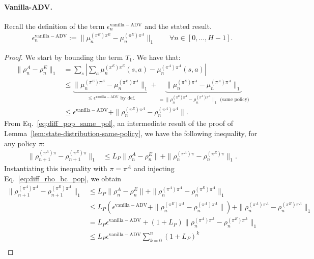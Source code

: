 \documentclass{article}
\begin{document}
\paragraph{Vanilla-ADV. } Recall the definition of the term $\epsilon_n^\mathrm{vanilla-ADV}$ and the stated result.
\begin{align}
    \epsilon^{\mathrm{vanilla-ADV}}_n := \|\mu^{(\pi^E)\pi^E}_n - \mu^{(\pi^E)\pi^A}_n \|_1 \qquad \forall n \in [0, \dots, H-1].
\end{align}

\boundvanillagail*
\begin{proof}
We start by bounding the term $T_1$. We have that:
\begin{align}
    \|\rho_n^A - \rho_n^E\|_1 &= \sum_s |\sum_a \mu_n^{(\pi^E)\pi^E}(s,a) - \mu_n^{(\pi^A)\pi^A}(s,a)|
    \\
    &\leq \underbrace{\|\mu_n^{(\pi^E)\pi^E} - \mu_n^{(\pi^E)\pi^A}\|_1}_{\leq \epsilon^{\mathrm{vanilla-ADV}} \text{ by def.}}
    + \underbrace{\|\mu_n^{(\pi^E)\pi^A} - \mu_n^{(\pi^A)\pi^A}\|_1}_{ = \|\rho_n^{(\pi^E)\pi^A} - \rho_n^{(\pi^A)\pi^A}\|_1 \text{ (same policy)}}
    \\
    &\leq \epsilon^{\mathrm{vanilla-ADV}} + \|\rho_n^{(\pi^E)\pi^A} - \rho_n^{(\pi^A)\pi^A}\|.
    \label{eq:diff_rho_bc_pop}
\end{align}
From Eq.~\eqref{eq:diff_pop_same_pol}, an intermediate result of the proof of Lemma~\ref{lem:state-distribution-same-policy}, we have the following inequality, for any policy $\pi$:
\begin{align}
     \|\rho_{n+1}^{(\pi^A)\pi} - \rho_{n+1}^{(\pi^E)\pi}\|_1 &\leq L_P\|\rho_n^A - \rho_n^E\| + \|\rho_n^{(\pi^A)\pi} - \rho_n^{(\pi^E)\pi}\|_1.
\end{align}
Instantiating this inequality with $\pi=\pi^A$ and injecting Eq.~\eqref{eq:diff_rho_bc_pop}, we obtain
\begin{align}
    \|\rho_{n+1}^{(\pi^A)\pi^A} - \rho_{n+1}^{(\pi^E)\pi^A}\|_1 &\leq L_P\|\rho_n^A - \rho_n^E\| + \|\rho_n^{(\pi^A)\pi^A} - \rho_n^{(\pi^E)\pi^A}\|_1
    \\
    &\leq L_P(\epsilon^{\mathrm{vanilla-ADV}} + \|\rho_n^{(\pi^E)\pi^A} - \rho_n^{(\pi^A)\pi^A}\|) + \|\rho_n^{(\pi^A)\pi^A} - \rho_n^{(\pi^E)\pi^A}\|_1
    \\
    &= L_P \epsilon^{\mathrm{vanilla-ADV}} + (1+L_P) \|\rho_n^{(\pi^A)\pi^A} - \rho_n^{(\pi^E)\pi^A}\|_1
    \\
    &\leq L_P \epsilon^{\mathrm{vanilla-ADV}} \sum_{k=0}^n (1+L_P)^k \\

\end{align}
\end{proof}
\end{document}
